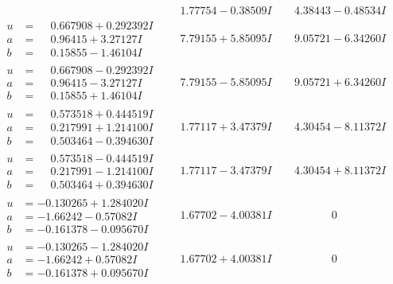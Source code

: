 \documentclass[1p]{elsarticle_modified}
\theoremstyle{definition}
\begin{document}
$$\begin{array}{c|c|c}
 & \phantom{-}1.77754 - 0.38509 I & \phantom{-}4.38443 - 0.48534 I \\ \hline\begin{aligned}
u &= \phantom{-}0.667908 + 0.292392 I \\
a &= \phantom{-}0.96415 + 3.27127 I \\
b &= \phantom{-}0.15855 - 1.46104 I\end{aligned}
 & \phantom{-}7.79155 + 5.85095 I & \phantom{-}9.05721 - 6.34260 I \\ \hline\begin{aligned}
u &= \phantom{-}0.667908 - 0.292392 I \\
a &= \phantom{-}0.96415 - 3.27127 I \\
b &= \phantom{-}0.15855 + 1.46104 I\end{aligned}
 & \phantom{-}7.79155 - 5.85095 I & \phantom{-}9.05721 + 6.34260 I \\ \hline\begin{aligned}
u &= \phantom{-}0.573518 + 0.444519 I \\
a &= \phantom{-}0.217991 + 1.214100 I \\
b &= \phantom{-}0.503464 - 0.394630 I\end{aligned}
 & \phantom{-}1.77117 + 3.47379 I & \phantom{-}4.30454 - 8.11372 I \\ \hline\begin{aligned}
u &= \phantom{-}0.573518 - 0.444519 I \\
a &= \phantom{-}0.217991 - 1.214100 I \\
b &= \phantom{-}0.503464 + 0.394630 I\end{aligned}
 & \phantom{-}1.77117 - 3.47379 I & \phantom{-}4.30454 + 8.11372 I \\ \hline\begin{aligned}
u &= -0.130265 + 1.284020 I \\
a &= -1.66242 - 0.57082 I \\
b &= -0.161378 - 0.095670 I\end{aligned}
 & \phantom{-}1.67702 - 4.00381 I & \phantom{-0.000000 } 0 \\ \hline\begin{aligned}
u &= -0.130265 - 1.284020 I \\
a &= -1.66242 + 0.57082 I \\
b &= -0.161378 + 0.095670 I\end{aligned}
 & \phantom{-}1.67702 + 4.00381 I & \phantom{-0.000000 } 0 \\ \hline\begin{aligned}

\end{aligned}
\end{array}$$
\end{document}
